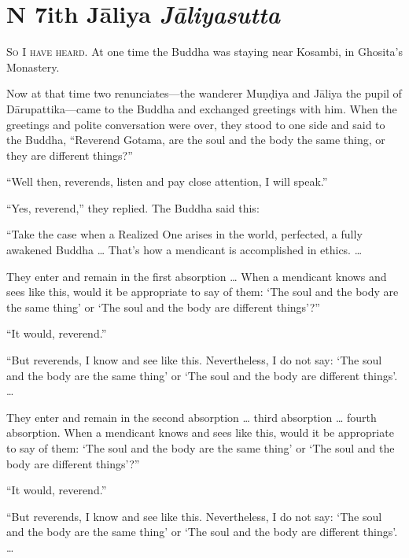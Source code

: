 \documentclass[12pt,openany]{book}%
\newcommand*{\suttatitleacronym}[1]{\smaller[2]{#1}\vspace*{.3em}}
\newcommand*{\suttatitletranslation}[1]{\linebreak{#1}}
\newcommand*{\suttatitleroot}[1]{\linebreak\smaller[2]\itshape{#1}}
\newcommand*{\tocacronym}[1]{\hspace*{-3.3em}{#1}\quad}
\newcommand*{\toctranslation}[1]{#1}
\newcommand*{\tocroot}[1]{(\textit{#1})}
\newcommand*{\scevam}[1]{\textsc{#1}}
\begin{document}
%
\chapter*{{\suttatitleacronym DN 7}{\suttatitletranslation With Jāliya }{\suttatitleroot Jāliyasutta}}
\addcontentsline{toc}{chapter}{\tocacronym{DN 7} \toctranslation{With Jāliya } \tocroot{Jāliyasutta}}

\scevam{So I have heard. }At one time the Buddha was staying near Kosambi, in Ghosita’s Monastery. 

Now at that time two renunciates—the wanderer \textsanskrit{Muṇḍiya} and \textsanskrit{Jāliya} the pupil of \textsanskrit{Dārupattika}—came to the Buddha and exchanged greetings with him. When the greetings and polite conversation were over, they stood to one side and said to the Buddha, “Reverend Gotama, are the soul and the body the same thing, or they are different things?” 

“Well then, reverends, listen and pay close attention, I will speak.” 

“Yes, reverend,” they replied. The Buddha said this: 

“Take the case when a Realized One arises in the world, perfected, a fully awakened Buddha … That’s how a mendicant is accomplished in ethics. … 

They enter and remain in the first absorption … When a mendicant knows and sees like this, would it be appropriate to say of them: ‘The soul and the body are the same thing’ or ‘The soul and the body are different things’?” 

“It would, reverend.” 

“But reverends, I know and see like this. Nevertheless, I do not say: ‘The soul and the body are the same thing’ or ‘The soul and the body are different things’. … 

They enter and remain in the second absorption … third absorption … fourth absorption. When a mendicant knows and sees like this, would it be appropriate to say of them: ‘The soul and the body are the same thing’ or ‘The soul and the body are different things’?” 

“It would, reverend.” 

“But reverends, I know and see like this. Nevertheless, I do not say: ‘The soul and the body are the same thing’ or ‘The soul and the body are different things’. … 
\end{document}
